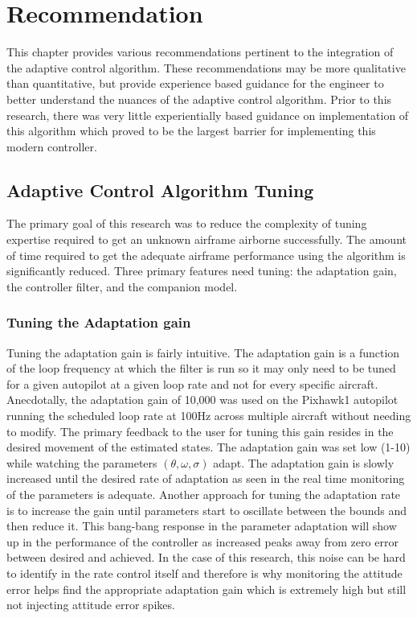 \chapter{Recommendation}\label{ch:recomendations}
This chapter provides various recommendations pertinent to the integration of the \Lone adaptive control algorithm.  These recommendations may be more qualitative than quantitative, but provide experience based guidance for the engineer to better understand the nuances of the \Lone adaptive control algorithm.  Prior to this research, there was very little experientially based guidance on implementation of this algorithm which proved to be the largest barrier for implementing this modern controller.

\section{\Lone Adaptive Control Algorithm Tuning}\label{sec:tuning}
The primary goal of this research was to reduce the complexity of tuning expertise required to get an unknown airframe airborne successfully.  The amount of time required to get the adequate airframe performance using the \Lone algorithm is significantly reduced.  Three primary features need tuning: the adaptation gain, the controller filter, and the companion model.

\subsection{Tuning the Adaptation gain}
Tuning the adaptation gain is fairly intuitive.  The adaptation gain is a function of the loop frequency at which the filter is run so it may only need to be tuned for a given autopilot at a given loop rate and not for every specific aircraft.  Anecdotally, the adaptation gain of 10,000 was used on the Pixhawk1 autopilot running the scheduled loop rate at 100Hz across multiple aircraft without needing to modify.  The primary feedback to the user for tuning this gain resides in the desired movement of the estimated states.  The adaptation gain was set low (1-10) while watching the parameters $(\theta, \omega, \sigma)$ adapt.  The adaptation gain is slowly increased until the desired rate of adaptation as seen in the real time monitoring of the parameters is adequate.  Another approach for tuning the adaptation rate is to increase the gain until parameters start to oscillate between the bounds and then reduce it.  This bang-bang response in the parameter adaptation will show up in the performance of the controller as increased peaks away from zero error between desired and achieved.  In the case of this research, this noise can be hard to identify in the rate control itself and therefore is why monitoring the attitude error helps find the appropriate adaptation gain which is extremely high but still not injecting attitude error spikes.

